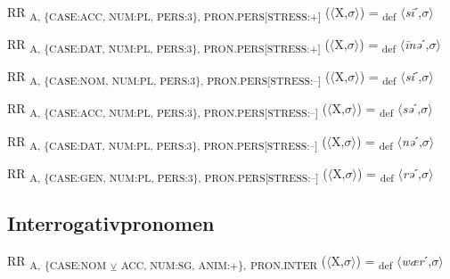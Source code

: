 {\begin{exe}
 RR \textsubscript{A, \{CASE:ACC, NUM:PL, PERS:3\}, PRON.PERS[STRESS:+]} ($\langle$X,$\sigma $$\rangle$) = \textsubscript{def} $\langle$\textit{s\=i}ˊ,$\sigma $$\rangle$
\end{exe}

\begin{exe}
 RR \textsubscript{A, \{CASE:DAT, NUM:PL, PERS:3\}, PRON.PERS[STRESS:+]} ($\langle$X,$\sigma $$\rangle$) = \textsubscript{def} $\langle$\textit{\=inə}ˊ,$\sigma $$\rangle$
\end{exe}

\begin{exe}
 RR \textsubscript{A, \{CASE:NOM, NUM:PL, PERS:3\}, PRON.PERS[STRESS:–]} ($\langle$X,$\sigma $$\rangle$) = \textsubscript{def} $\langle$\textit{si}ˊ,$\sigma $$\rangle$
\end{exe}

\begin{exe}
 RR \textsubscript{A, \{CASE:ACC, NUM:PL, PERS:3\}, PRON.PERS[STRESS:–]} ($\langle$X,$\sigma $$\rangle$) = \textsubscript{def} $\langle$\textit{sə}ˊ,$\sigma $$\rangle$
\end{exe}

\begin{exe}
 RR \textsubscript{A, \{CASE:DAT, NUM:PL, PERS:3\}, PRON.PERS[STRESS:–]} ($\langle$X,$\sigma $$\rangle$) = \textsubscript{def} $\langle$\textit{nə}ˊ,$\sigma $$\rangle$
\end{exe}

\begin{exe}
 RR \textsubscript{A, \{CASE:GEN, NUM:PL, PERS:3\}, PRON.PERS[STRESS:–]} ($\langle$X,$\sigma $$\rangle$) = \textsubscript{def} $\langle$\textit{rə}ˊ,$\sigma $$\rangle$
\end{exe}

\subsection{Interrogativpronomen}

\begin{exe}
 RR \textsubscript{A,} \textsubscript{\{CASE:NOM} \textsubscript{${\veebar}$}\textsubscript{ ACC, NUM:SG, ANIM:+\},} \textsubscript{PRON.INTER} ($\langle$X,$\sigma $$\rangle$) = \textsubscript{def} $\langle$\textit{wær}ˊ,$\sigma $$\rangle$
\end{exe}

}
